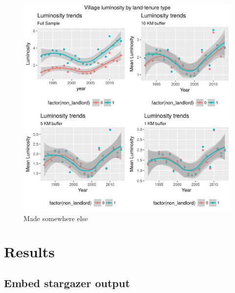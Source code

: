 \documentclass[12pt,]{article}
\begin{document}
\begin{figure}
\centering
\includegraphics{Figs/luminosity_grid.png}
\caption{Made somewhere else}
\end{figure}

\newpage

\section{Results}\label{results}

\subsection{Embed stargazer output}\label{embed-stargazer-output}
\end{document}
